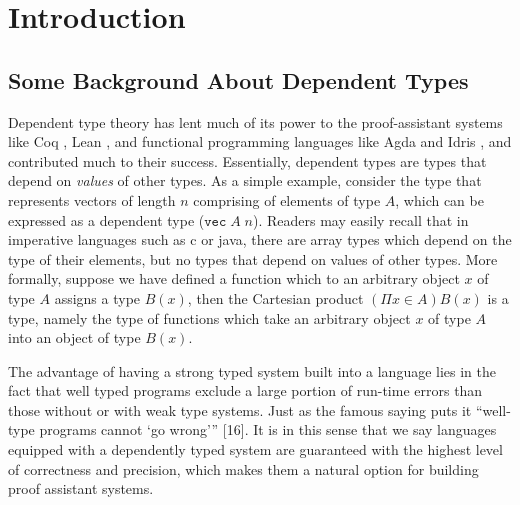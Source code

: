 \chapter{Introduction}
\section{Some Background About Dependent Types}
Dependent type theory has lent much of its power to the proof-assistant systems like Coq \cite{huet1997coq}, Lean \cite{de2015lean}, and functional programming languages like Agda \cite{norell2008dependently} and Idris \cite{brady2013idris}, and contributed much to their success. Essentially, dependent types are types that depend on \emph{values} of other types. As a simple example, consider the type that represents vectors of length $n$ comprising of elements of type $A$, which can be expressed as a dependent type ($\texttt{vec}\; A\; n$). Readers may easily recall that in imperative languages such as c or java, there are array types which depend on the type of their elements, but no types that depend on values of other types. More formally, suppose we have defined a function which to an arbitrary object $x$ of type $A$ assigns a type $B(x)$, then the Cartesian product $(\Pi x \in A)B(x)$ is a type, namely the type of functions which take an arbitrary object $x$ of type $A$ into an object of type $B(x)$.

The advantage of having a strong typed system built into a language lies in the fact that well typed programs exclude a large portion of run-time errors than those without or with weak type systems. Just as the famous saying puts it “well-type programs cannot ‘go wrong’” [16]. It is in this sense that we say languages equipped with a dependently typed system are guaranteed with the highest level of correctness and precision, which makes them a natural option for building proof assistant systems.

